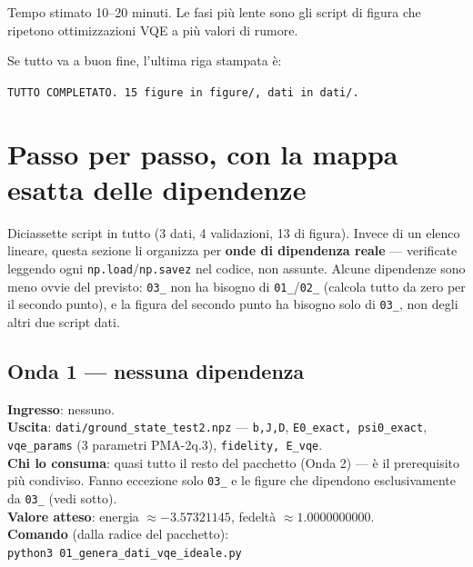 \documentclass[11pt,a4paper]{article}
\newcommand{\code}[1]{\texttt{\small #1}}
\begin{document}
\begin{okbox}{Tempo stimato}
10--20 minuti. Le fasi più lente sono gli script di figura che ripetono
ottimizzazioni VQE a più valori di rumore.
\end{okbox}

Se tutto va a buon fine, l'ultima riga stampata è:
\begin{keyeq}
\centering
\code{TUTTO COMPLETATO. 15 figure in figure/, dati in dati/.}
\end{keyeq}

\section{Passo per passo, con la mappa esatta delle dipendenze}

Diciassette script in tutto (3 dati, 4 validazioni, 13 di figura).
Invece di un elenco lineare, questa sezione li organizza per
\textbf{onde di dipendenza reale} --- verificate leggendo ogni
\code{np.load}/\code{np.savez} nel codice, non assunte. Alcune
dipendenze sono meno ovvie del previsto: \code{03\_} non ha bisogno di
\code{01\_}/\code{02\_} (calcola tutto da zero per il secondo punto), e
la figura del secondo punto ha bisogno solo di \code{03\_}, non degli
altri due script dati.

\subsection{Onda 1 --- nessuna dipendenza}

\begin{keyeq}[title={01\_genera\_dati\_vqe\_ideale.py}]
\textbf{Ingresso}: nessuno.\\
\textbf{Uscita}: \code{dati/ground\_state\_test2.npz} --- \code{b,J,D},
\code{E0\_exact, psi0\_exact}, \code{vqe\_params} (3 parametri PMA-2q.3),
\code{fidelity, E\_vqe}.\\
\textbf{Chi lo consuma}: quasi tutto il resto del pacchetto (Onda 2) ---
è il prerequisito più condiviso. Fanno eccezione solo \code{03\_} e le
figure che dipendono esclusivamente da \code{03\_} (vedi sotto).\\
\textbf{Valore atteso}: energia $\approx-3.57321145$, fedeltà $\approx1.0000000000$.\\
\textbf{Comando} (dalla radice del pacchetto):\\
\code{python3 01\_genera\_dati\_vqe\_ideale.py}
\end{keyeq}
\end{document}
